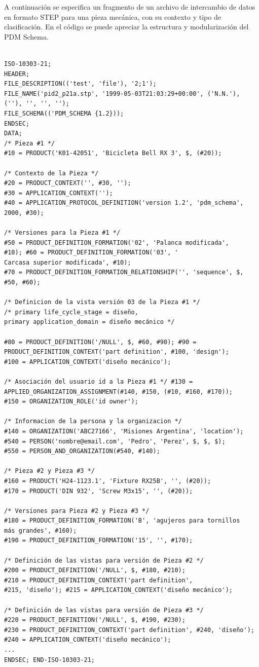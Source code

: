 A continuación se especifica un fragmento de un archivo de intercambio de datos en formato STEP para una pieza mecánica, con su contexto y tipo de clasificación. En el código se puede apreciar la estructura y modularización del PDM Schema.
\begin{verbatim}

ISO-10303-21; 
HEADER; 
FILE_DESCRIPTION(('test', 'file'), '2;1');
FILE_NAME('pid2_p21a.stp', '1999-05-03T21:03:29+00:00', ('N.N.'),
(''), '', '', ''); 
FILE_SCHEMA(('PDM_SCHEMA {1.2})); 
ENDSEC; 
DATA;
/* Pieza #1 */ 
#10 = PRODUCT('K01-42051', 'Bicicleta Bell RX 3', $, (#20));

/* Contexto de la Pieza */ 
#20 = PRODUCT_CONTEXT('', #30, ''); 
#30 = APPLICATION_CONTEXT(''); 
#40 = APPLICATION_PROTOCOL_DEFINITION('version 1.2', 'pdm_schema',
2000, #30);

/* Versiones para la Pieza #1 */ 
#50 = PRODUCT_DEFINITION_FORMATION('02', 'Palanca modificada',
#10); #60 = PRODUCT_DEFINITION_FORMATION('03', '
Carcasa superior modificada', #10); 
#70 = PRODUCT_DEFINITION_FORMATION_RELATIONSHIP('', 'sequence', $,
#50, #60);

/* Definicion de la vista versión 03 de la Pieza #1 */ 
/* primary life_cycle_stage = diseño, 
primary application_domain = diseño mecánico */ 

#80 = PRODUCT_DEFINITION('/NULL', $, #60, #90); #90 =
PRODUCT_DEFINITION_CONTEXT('part definition', #100, 'design');
#100 = APPLICATION_CONTEXT('diseño mecánico');

/* Asociación del usuario id a la Pieza #1 */ #130 =
APPLIED_ORGANIZATION_ASSIGNMENT(#140, #150, (#10, #160, #170));
#150 = ORGANIZATION_ROLE('id owner');

/* Informacion de la persona y la organizacion */ 
#140 = ORGANIZATION('ABC27166', 'Misiones Argentina', 'location');
#540 = PERSON('nombre@email.com', 'Pedro', 'Perez', $, $, $);
#550 = PERSON_AND_ORGANIZATION(#540, #140);

/* Pieza #2 y Pieza #3 */ 
#160 = PRODUCT('H24-1123.1', 'Fixture RX25B', '', (#20)); 
#170 = PRODUCT('DIN 932', 'Screw M3x15', '', (#20));

/* Versiones para Pieza #2 y Pieza #3 */ 
#180 = PRODUCT_DEFINITION_FORMATION('B', 'agujeros para tornillos
más grandes', #160); 
#190 = PRODUCT_DEFINITION_FORMATION('15', '', #170);

/* Definición de las vistas para versión de Pieza #2 */ 
#200 = PRODUCT_DEFINITION('/NULL', $, #180, #210); 
#210 = PRODUCT_DEFINITION_CONTEXT('part definition',
#215, 'diseño'); #215 = APPLICATION_CONTEXT('diseño mecánico');

/* Definición de las vistas para versión de Pieza #3 */ 
#220 = PRODUCT_DEFINITION('/NULL', $, #190, #230); 
#230 = PRODUCT_DEFINITION_CONTEXT('part definition', #240, 'diseño'); 
#240 = APPLICATION_CONTEXT('diseño mecánico');
...
ENDSEC; END-ISO-10303-21;
\end{verbatim}



